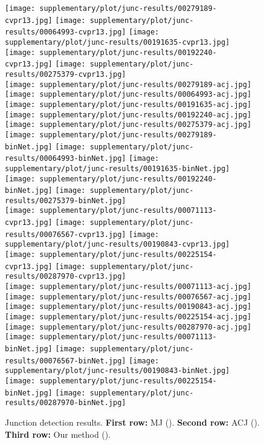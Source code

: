 \documentclass[10pt,twocolumn,letterpaper]{article}
\begin{document}
\begin{figure*}[t]
\texttt{[image: supplementary/plot/junc-results/00279189-cvpr13.jpg]}
\texttt{[image: supplementary/plot/junc-results/00064993-cvpr13.jpg]}
\texttt{[image: supplementary/plot/junc-results/00191635-cvpr13.jpg]}
\texttt{[image: supplementary/plot/junc-results/00192240-cvpr13.jpg]}
\texttt{[image: supplementary/plot/junc-results/00275379-cvpr13.jpg]}
\\
\texttt{[image: supplementary/plot/junc-results/00279189-acj.jpg]}
\texttt{[image: supplementary/plot/junc-results/00064993-acj.jpg]}
\texttt{[image: supplementary/plot/junc-results/00191635-acj.jpg]}
\texttt{[image: supplementary/plot/junc-results/00192240-acj.jpg]}
\texttt{[image: supplementary/plot/junc-results/00275379-acj.jpg]}
\\
\texttt{[image: supplementary/plot/junc-results/00279189-binNet.jpg]}
\texttt{[image: supplementary/plot/junc-results/00064993-binNet.jpg]}
\texttt{[image: supplementary/plot/junc-results/00191635-binNet.jpg]}
\texttt{[image: supplementary/plot/junc-results/00192240-binNet.jpg]}
\texttt{[image: supplementary/plot/junc-results/00275379-binNet.jpg]}
\\

\texttt{[image: supplementary/plot/junc-results/00071113-cvpr13.jpg]}
\texttt{[image: supplementary/plot/junc-results/00076567-cvpr13.jpg]}
\texttt{[image: supplementary/plot/junc-results/00190843-cvpr13.jpg]}
\texttt{[image: supplementary/plot/junc-results/00225154-cvpr13.jpg]}
\texttt{[image: supplementary/plot/junc-results/00287970-cvpr13.jpg]}
\\
\texttt{[image: supplementary/plot/junc-results/00071113-acj.jpg]}
\texttt{[image: supplementary/plot/junc-results/00076567-acj.jpg]}
\texttt{[image: supplementary/plot/junc-results/00190843-acj.jpg]}
\texttt{[image: supplementary/plot/junc-results/00225154-acj.jpg]}
\texttt{[image: supplementary/plot/junc-results/00287970-acj.jpg]}
\\
\texttt{[image: supplementary/plot/junc-results/00071113-binNet.jpg]}
\texttt{[image: supplementary/plot/junc-results/00076567-binNet.jpg]}
\texttt{[image: supplementary/plot/junc-results/00190843-binNet.jpg]}
\texttt{[image: supplementary/plot/junc-results/00225154-binNet.jpg]}
\texttt{[image: supplementary/plot/junc-results/00287970-binNet.jpg]}
\\
\caption{Junction detection results. {\bf First row:} MJ (). {\bf Second row:} ACJ (). {\bf Third row:} Our method (). }
\label{fig:junc-results}
\end{figure*}
\end{document}
